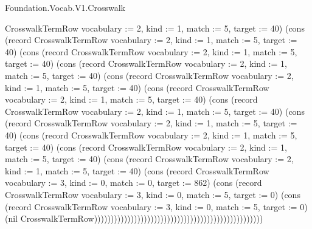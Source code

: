 \begin{lexlean}{Foundation.Vocab.V1.Crosswalk}
\begin{semanticmodule}
{CrosswalkTermRow {vocabulary := 2, kind := 1, match := 5, target := 40}) (cons (record CrosswalkTermRow {vocabulary := 2, kind := 1, match := 5, target := 40}) (cons (record CrosswalkTermRow {vocabulary := 2, kind := 1, match := 5, target := 40}) (cons (record CrosswalkTermRow {vocabulary := 2, kind := 1, match := 5, target := 40}) (cons (record CrosswalkTermRow {vocabulary := 2, kind := 1, match := 5, target := 40}) (cons (record CrosswalkTermRow {vocabulary := 2, kind := 1, match := 5, target := 40}) (cons (record CrosswalkTermRow {vocabulary := 2, kind := 1, match := 5, target := 40}) (cons (record CrosswalkTermRow {vocabulary := 2, kind := 1, match := 5, target := 40}) (cons (record CrosswalkTermRow {vocabulary := 2, kind := 1, match := 5, target := 40}) (cons (record CrosswalkTermRow {vocabulary := 2, kind := 1, match := 5, target := 40}) (cons (record CrosswalkTermRow {vocabulary := 2, kind := 1, match := 5, target := 40}) (cons (record CrosswalkTermRow {vocabulary := 3, kind := 0, match := 0, target := 862}) (cons (record CrosswalkTermRow {vocabulary := 3, kind := 0, match := 5, target := 0}) (cons (record CrosswalkTermRow {vocabulary := 3, kind := 0, match := 5, target := 0}) (nil CrosswalkTermRow)))))))))))))))))))))))))))))))))))))))))))))))))))
}


\end{semanticmodule}
\end{lexlean}
